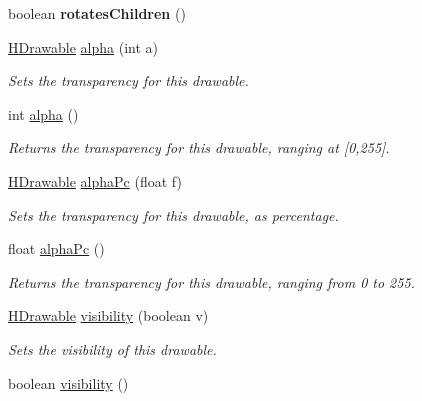 \begin{DoxyCompactItemize}
\item 
\hypertarget{classhype_1_1core_1_1drawable_1_1_h_drawable_abb9954d239c0f8aec7fdaebe7c6ba02f}{boolean {\bfseries rotates\-Children} ()}\label{classhype_1_1core_1_1drawable_1_1_h_drawable_abb9954d239c0f8aec7fdaebe7c6ba02f}

\item 
\hyperlink{classhype_1_1core_1_1drawable_1_1_h_drawable}{H\-Drawable} \hyperlink{classhype_1_1core_1_1drawable_1_1_h_drawable_ae0711e3bde7279c84b0282f928bbe699}{alpha} (int a)
\begin{DoxyCompactList}\small\item\em Sets the transparency for this drawable. \end{DoxyCompactList}\item 
int \hyperlink{classhype_1_1core_1_1drawable_1_1_h_drawable_ab3b43c250064df54b92a6939bddd0b43}{alpha} ()
\begin{DoxyCompactList}\small\item\em Returns the transparency for this drawable, ranging at {\ttfamily \mbox{[}0,255\mbox{]}}. \end{DoxyCompactList}\item 
\hyperlink{classhype_1_1core_1_1drawable_1_1_h_drawable}{H\-Drawable} \hyperlink{classhype_1_1core_1_1drawable_1_1_h_drawable_ad4f0e4c9f93d810c66b39f1715625719}{alpha\-Pc} (float f)
\begin{DoxyCompactList}\small\item\em Sets the transparency for this drawable, as percentage. \end{DoxyCompactList}\item 
float \hyperlink{classhype_1_1core_1_1drawable_1_1_h_drawable_a3be1ca0802560e21622875604b0da0ff}{alpha\-Pc} ()
\begin{DoxyCompactList}\small\item\em Returns the transparency for this drawable, ranging from 0 to 255. \end{DoxyCompactList}\item 
\hyperlink{classhype_1_1core_1_1drawable_1_1_h_drawable}{H\-Drawable} \hyperlink{classhype_1_1core_1_1drawable_1_1_h_drawable_abad4b596d0577a3655ff0827aac62ee2}{visibility} (boolean v)
\begin{DoxyCompactList}\small\item\em Sets the visibility of this drawable. \end{DoxyCompactList}\item 
boolean \hyperlink{classhype_1_1core_1_1drawable_1_1_h_drawable_af123e1795e471825ca608a2b90e88163}{visibility} ()

\end{DoxyCompactItemize}
